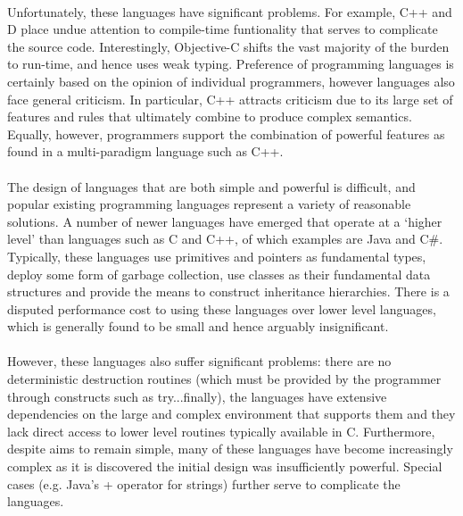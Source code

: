 \documentclass{article}
\begin{document}
\paragraph{}
Unfortunately, these languages have significant problems. For example, C++ and D place undue attention to compile-time funtionality that serves to complicate the source code. Interestingly, Objective-C shifts the vast majority of the burden to run-time, and hence uses weak typing. Preference of programming languages is certainly based on the opinion of individual programmers, however languages also face general criticism. In particular, C++ attracts criticism due to its large set of features and rules that ultimately combine to produce complex semantics. Equally, however, programmers support the combination of powerful features as found in a multi-paradigm language such as C++.

\paragraph{}
The design of languages that are both simple and powerful is difficult, and popular existing programming languages represent a variety of reasonable solutions. A number of newer languages have emerged that operate at a `higher level' than languages such as C and C++, of which examples are Java and C\#. Typically, these languages use primitives and pointers as fundamental types, deploy some form of garbage collection, use classes as their fundamental data structures and provide the means to construct inheritance hierarchies. There is a disputed performance cost to using these languages over lower level languages, which is generally found to be small and hence arguably insignificant.

\paragraph{}
However, these languages also suffer significant problems: there are no deterministic destruction routines (which must be provided by the programmer through constructs such as try...finally), the languages have extensive dependencies on the large and complex environment that supports them and they lack direct access to lower level routines typically available in C. Furthermore, despite aims to remain simple, many of these languages have become increasingly complex as it is discovered the initial design was insufficiently powerful. Special cases (e.g. Java's + operator for strings) further serve to complicate the languages.
\end{document}
